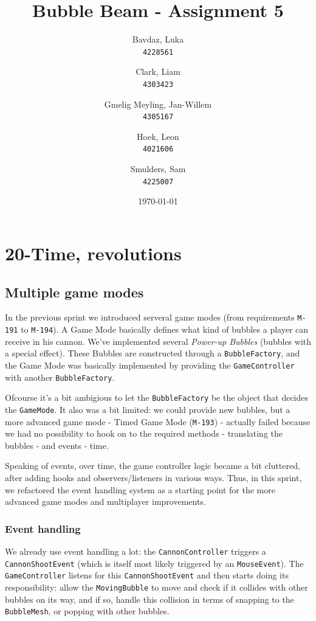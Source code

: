 \documentclass[a4paper]{article}
\title{Bubble Beam - Assignment 5}
\author{
    Bavdaz, Luka\\
    \texttt{4228561}
    \and
    Clark, Liam\\
    \texttt{4303423}
    \and
    Gmelig Meyling, Jan-Willem\\
    \texttt{4305167}
    \and
    Hoek, Leon\\
    \texttt{4021606}
    \and
    Smulders, Sam\\
    \texttt{4225007}
}
\date{\today}
\begin{document}
\maketitle

\section{20-Time, revolutions}

\subsection{Multiple game modes}
In the previous sprint we introduced serveral game modes (from requirements \texttt{M-191} to \texttt{M-194}). A Game Mode basically defines what kind of bubbles a player can receive in his cannon. We've implemented several \textit{Power-up Bubbles} (bubbles with a special effect). These Bubbles are constructed through a \texttt{BubbleFactory}, and the Game Mode was basically implemented by providing the \texttt{GameController} with another \texttt{BubbleFactory}.

\par{}Ofcourse it's a bit ambigious to let the \texttt{BubbleFactory} be the object that decides the \texttt{GameMode}. It also was a bit limited: we could provide new bubbles, but a more advanced game mode - Timed Game Mode (\texttt{M-193}) - actually failed because we had no possibility to hook on to the required methods - translating the bubbles - and events - time.

\par{}Speaking of events, over time, the game controller logic became a bit cluttered, after adding hooks and observers/listeners in various ways. Thus, in this sprint, we refactored the event handling system as a starting point for the more advanced game modes and multiplayer improvements.

\subsubsection{Event handling}
\label{sec:evthdl}

We already use event handling a lot: the \texttt{CannonController} triggers a \texttt{CannonShootEvent} (which is itself most likely triggered by an \texttt{MouseEvent}). The \texttt{GameController} listens for this \texttt{CannonShootEvent} and then starts doing its responsibility: allow the \texttt{MovingBubble} to move and check if it collides with other bubbles on its way, and if so, handle this collision in terms of snapping to the \texttt{BubbleMesh}, or popping with other bubbles.
\end{document}
